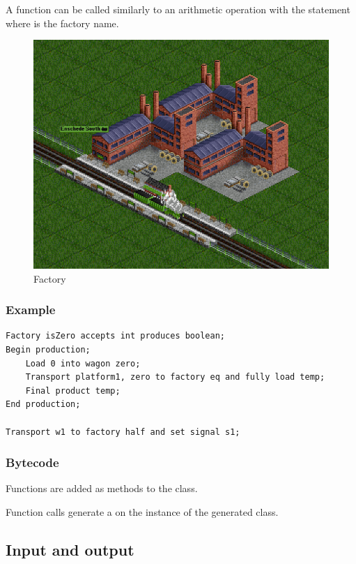 A function can be called similarly to an arithmetic operation with the  statement where  is the factory name.

\begin{figure}[t]
\centering
\includegraphics[scale=0.25]{Images/factory}
\caption{Factory}
\label{fig:factory}
\end{figure}

\subsubsection*{Example}

\begin{lstlisting}
Factory isZero accepts int produces boolean;
Begin production;
	Load 0 into wagon zero;
	Transport platform1, zero to factory eq and fully load temp;
	Final product temp;
End production;

Transport w1 to factory half and set signal s1;
\end{lstlisting}

\subsubsection*{Bytecode}

Functions are added as methods to the class.

Function calls generate a  on the instance of the generated class.

\subsection{Input and output}

